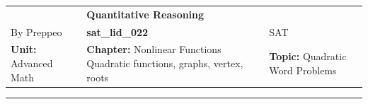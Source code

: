 \documentclass[11pt,paper=a4,answers]{exam}
\begin{document}
\begin{center}
    \centering
    \renewcommand{\arraystretch}{1.5}
    \begin{tabularx}{\textwidth}{YYY}
    & \normalsize\bf{{\Large{{Quantitative Reasoning}}}} & \\
    By Preppeo & \normalsize\bf{{sat\_lid\_022}} & SAT\\
    \normalsize{{\textbf{{Unit:}} Advanced Math}} & \normalsize{{\textbf{{Chapter:}} Nonlinear Functions	Quadratic functions, graphs, vertex, roots}} & \normalsize{{\textbf{{Topic:}} Quadratic Word Problems}} \\
    \end{tabularx}
\end{center}
\par\noindent\rule{\textwidth}{1pt}
\end{document}
